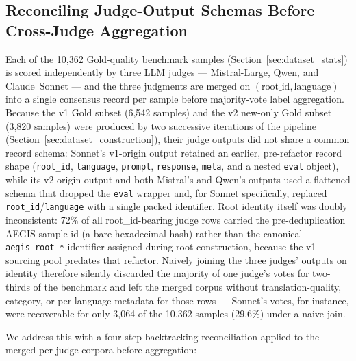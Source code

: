 \subsection{Reconciling Judge-Output Schemas Before Cross-Judge Aggregation}
\label{sec:missing_fields_reconciliation}

Each of the 10{,}362 Gold-quality benchmark samples (Section~\ref{sec:dataset_stats})
is scored independently by three LLM judges --- Mistral-Large, Qwen, and
Claude~Sonnet --- and the three judgments are merged on
$(\text{root\_id}, \text{language})$ into a single consensus record per sample
before majority-vote label aggregation. Because the v1 Gold subset
(6{,}542 samples) and the v2 new-only Gold subset (3{,}820 samples) were
produced by two successive iterations of the pipeline
(Section~\ref{sec:dataset_construction}), their judge outputs did not share a
common record schema: Sonnet's v1-origin output retained an earlier,
pre-refactor record shape (\texttt{root\_id}, \texttt{language}, \texttt{prompt},
\texttt{response}, \texttt{meta}, and a nested \texttt{eval} object), while its
v2-origin output and both Mistral's and Qwen's outputs used a flattened schema
that dropped the \texttt{eval} wrapper and, for Sonnet specifically, replaced
\texttt{root\_id}/\texttt{language} with a single packed identifier. Root
identity itself was doubly inconsistent: 72\% of all root\_id-bearing judge
rows carried the pre-deduplication AEGIS sample id (a bare hexadecimal hash)
rather than the canonical \texttt{aegis\_root\_*} identifier assigned during
root construction, because the v1 sourcing pool predates that refactor.
Naively joining the three judges' outputs on identity therefore silently
discarded the majority of one judge's votes for two-thirds of the benchmark
and left the merged corpus without translation-quality, category, or
per-language metadata for those rows --- Sonnet's votes, for instance, were
recoverable for only 3{,}064 of the 10{,}362 samples (29.6\%) under a naive
join.

We address this with a four-step backtracking reconciliation applied to the
merged per-judge corpora before aggregation:

